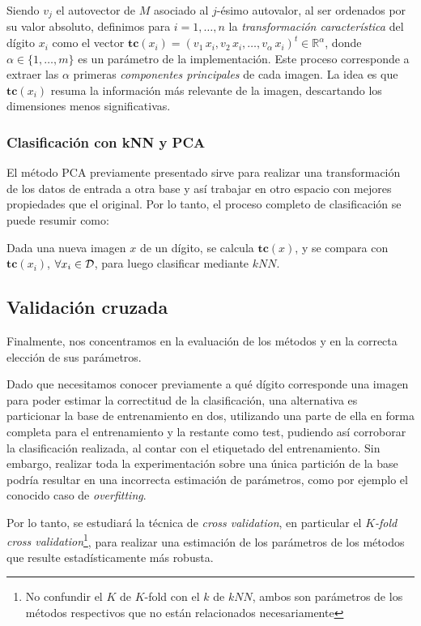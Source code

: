 \documentclass[11pt, a4paper]{article}
\newcommand{\real}{\mathbb{R}}
\newcommand{\kpca}{\alpha}
\newcommand{\kkfold}{K}
\begin{document}
Siendo $v_j$ el autovector de $M$ asociado al $j$-ésimo autovalor, al ser ordenados por su valor absoluto, definimos para $i = 1,\ldots,n$ la \textsl{transformación característica} del dígito $x_{i}$ como el vector $\mathbf{tc}(x_i) = (v_1\, x_i, v_2\, x_i,\ldots,v_{\kpca}\, x_i)^t \in\real^{\kpca}$, donde $\kpca \in\{1,\ldots,m\}$ es un parámetro de la implementación. 
%
Este proceso corresponde a extraer las $\kpca$ primeras \textit{componentes principales} de cada imagen. La idea es que $\mathbf{tc}(x_i)$ resuma la información más relevante de la imagen, descartando los dimensiones menos significativas. 

\subsubsection*{Clasificación con kNN y PCA}

El método PCA previamente presentado sirve para realizar una transformación de los datos de entrada a otra base y así trabajar en otro espacio con mejores propiedades que el original.
%
Por lo tanto, el proceso completo de clasificación se puede resumir como:

Dada una nueva imagen $x$ de un dígito, se calcula $\mathbf{tc}(x)$, y se compara con $\mathbf{tc}(x_i)$, $\forall x_i \in {\cal D}$, para luego clasificar mediante $kNN$.

\subsection*{Validación cruzada}

Finalmente, nos concentramos en la evaluación de los métodos y en la correcta elección de sus parámetros.

Dado que necesitamos conocer previamente a qué dígito corresponde una imagen para poder estimar la correctitud de la clasificación, una alternativa es particionar la base de entrenamiento en dos, utilizando una parte de ella en forma completa para el entrenamiento y la restante como test, pudiendo así corroborar la clasificación realizada, al contar con el etiquetado del entrenamiento. 
%
Sin embargo, realizar toda la experimentación sobre una única partición de la base podría resultar en una incorrecta estimación de parámetros, como por ejemplo el conocido caso de \emph{overfitting}. 

Por lo tanto, se estudiará la técnica de \emph{cross validation}\cite{duda2012pattern}, en particular el \emph{$\kkfold$-fold cross validation}\footnote{No confundir el $K$ de $\kkfold$-fold con el $k$ de $kNN$, ambos son parámetros de los métodos respectivos que no están relacionados necesariamente}, 
para realizar una estimación de los parámetros de los métodos que resulte estadísticamente más robusta. 
\end{document}

